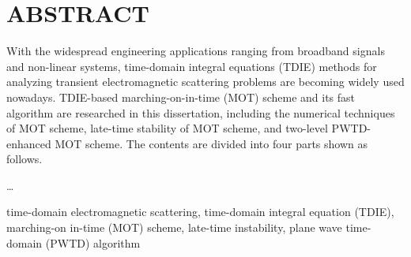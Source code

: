\chapter*{\bf ABSTRACT}

With the widespread engineering applications ranging from broadband
signals and non-linear systems, time-domain integral equations (TDIE)
methods for analyzing transient electromagnetic scattering problems
are becoming widely used nowadays. TDIE-based marching-on-in-time
(MOT) scheme and its fast algorithm are researched in this
dissertation, including the numerical techniques of MOT scheme,
late-time stability of MOT scheme, and two-level PWTD-enhanced MOT
scheme. The contents are divided into four parts shown as follows.

\ldots

\bigskip

%
%
time-domain electromagnetic scattering,
time-domain integral equation (TDIE),
marching-on in-time (MOT) scheme,
late-time instability,
plane wave time-domain (PWTD) algorithm
